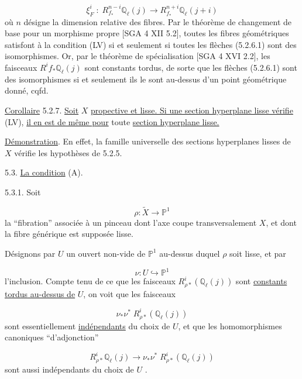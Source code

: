 \begin{equation}\tag{5.2.6.1}
\xi_F^i \; : \; R^{n-i}_{f_*}\mathbb{Q}_\ell(j) \longrightarrow R^{n+i}_{f_*}\mathbb{Q}_\ell(j+i)
\end{equation}
où $n$ désigne la dimension relative des fibres. Par le théorème de changement de base pour un morphisme propre [SGA 4 XII 5.2], toutes les fibres géométriques satisfont à la condition (LV) si et seulement si toutes les flèches (5.2.6.1) sont des isomorphismes. Or, par le théorème de spécialisation [SGA 4 XVI 2.2], les faisceaux $R^i f_*\mathbb{Q}_\ell(j)$ sont constants tordus, de sorte que les flèches (5.2.6.1) sont des isomorphismes si et seulement ils le sont au-dessus d'un point géométrique donné, cqfd.

\underline{Corollaire} 5.2.7. \underline{Soit} $X$ \underline{propective et lisse. Si une section hyperplane lisse vérifie} (LV), \underline{il en est de même pour} toute \underline{section hyperplane lisse.}

\underline{Démonstration}. En effet, la famille universelle des sections hyperplanes lisses de $X$ vérifie les hypothèses de 5.2.5.



5.3. \underline{La condition} (A).

5.3.1. Soit

\begin{equation*}
\rho : \widetilde{X} \longrightarrow \mathbb{P}^1
\end{equation*}
la ``fibration'' associée à un pinceau dont l'axe coupe transversalement $X$, et dont la fibre générique est supposée lisse.

Désignons par $U$ un ouvert non-vide de $\mathbb{P}^1$ au-dessus duquel $\rho$ soit lisse, et par

\begin{equation}\tag{5.3.1.1}
\nu : U \hookrightarrow \mathbb{P}^1
\end{equation}
l'inclusion. Compte tenu de ce que les faisceaux $R^i_{\rho*}(\mathbb{Q}_\ell(j))$ sont \underline{constants tordus au-dessus de} $U$, on voit que les faisceaux

\begin{equation*}
\nu_*\nu^* \; R^i_{\rho*}(\mathbb{Q}_\ell(j))
\end{equation*}
sont essentiellement \underline{indépendants} du choix de $U$, et que les homomorphismes canoniques ``d'adjonction''

\begin{equation}\tag{5.3.2}
R^i_{\rho*}\mathbb{Q}_\ell(j) \longrightarrow \nu_*\nu^* \; R^i_{\rho*}(\mathbb{Q}_\ell(j))
\end{equation}
sont aussi indépendants du choix de $U$ .

